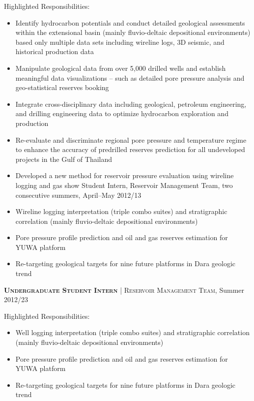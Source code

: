 \documentclass[10pt, letter]{article}
\begin{document}
\bigskip
Highlighted Responsibilities:
\begin{itemize}[leftmargin=*]
    \item Identify hydrocarbon potentials and conduct detailed geological assessments within the extensional basin (mainly fluvio-deltaic depositional environments) based only multiple data sets including wireline logs, 3D seismic, and historical production data
    \item Manipulate geological data from over 5,000 drilled wells and establish meaningful data visualizations – such as detailed pore pressure analysis and geo-statistical reserves booking
    \item Integrate cross-disciplinary data including geological, petroleum engineering, and drilling engineering data to optimize hydrocarbon exploration and production
    \item Re-evaluate and discriminate regional pore pressure and temperature regime to enhance the accuracy of predrilled reserves prediction for all undeveloped projects in the Gulf of Thailand
    \item Developed a new method for reservoir pressure evaluation using wireline logging and gas show
Student Intern, Reservoir Management Team, two consecutive summers, April–May 2012/13
    \item Wireline logging interpretation (triple combo suites) and stratigraphic correlation (mainly fluvio-deltaic depositional environments)
    \item Pore pressure profile prediction and oil and gas reserves estimation for YUWA platform
    \item Re-targeting geological targets for nine future platforms in Dara geologic trend
\end{itemize}

\textsc{\textbf{Undergraduate Student Intern}} | \textsc{Reservoir Management Team}, Summer 2012/23

\bigskip
Highlighted Responsibilities:
\begin{itemize}[leftmargin=*]
    \item Well logging interpretation (triple combo suites) and stratigraphic correlation (mainly fluvio-deltaic depositional environments)
    \item Pore pressure profile prediction and oil and gas reserves estimation for YUWA platform
    \item Re-targeting geological targets for nine future platforms in Dara geologic trend


\end{itemize}
\end{document}
